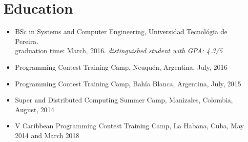 \documentclass[11pt,a4paper,sans]{moderncv}        %
\begin{document}
\section{Education}
\begin{itemize}
  \item{BSc in Systems and Computer Engineering, Universidad Tecnológia de Pereira. \\ graduation time: March, 2016. \textit{distinguished student with GPA: 4.3/5}}
  \item{Programming Contest Training Camp, Neuquén, Argentina, July, 2016}
  \item{Programming Contest Training Camp, Bahía Blanca, Argentina, July, 2015}
  \item{Super and Distributed Computing Summer Camp,  Manizales, Colombia, August, 2014}
  \item{V Caribbean Programming Contest Training Camp, La Habana, Cuba, May 2014 and March 2018}
\end{itemize}


\end{document}
